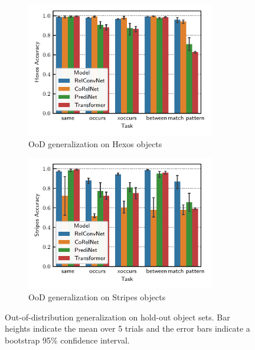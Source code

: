 \begin{figure}[ht]
    \vskip-10pt
    \centering
    \begin{subfigure}{0.45\textwidth}
        \centering
        \includegraphics[width=0.9\textwidth]{figs/experiments/hexos_acc.pdf}
        \vskip-5pt
        \caption{OoD generalization on Hexos objects}\label{fig:ood_generalization_hexos}
    \end{subfigure}
    \begin{subfigure}{0.45\textwidth}
        \centering
        \includegraphics[width=0.9\textwidth]{figs/experiments/stripes_acc.pdf}
        \vskip-5pt
        \caption{OoD generalization on Stripes objects}\label{fig:ood_generalization_stripes}
    \end{subfigure}
    \vskip-5pt
    \caption{Out-of-distribution generalization on hold-out object sets. Bar heights indicate the mean over 5 trials and the error bars indicate a bootstrap 95\% confidence interval.}\label{fig:ood_generalization}
    \vskip-8pt
\end{figure}

